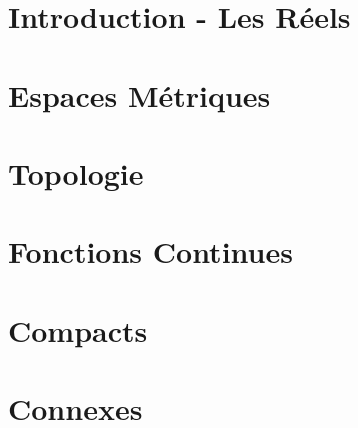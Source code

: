 



\chapter{Introduction - Les Réels}


\chapter{Espaces Métriques}


\chapter{Topologie}


\chapter{Fonctions Continues}


\chapter{Compacts}


\chapter{Connexes}


% 
